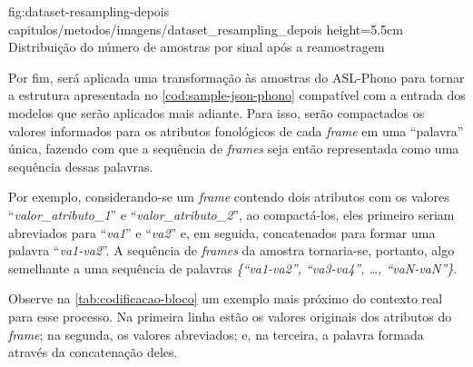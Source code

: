 \figura
{fig:dataset-resampling-depois} %
{capitulos/metodos/imagens/dataset_resampling_depois} %
{height=5.5cm} %
{Distribuição do número de amostras por sinal após a reamostragem} %
{} %





Por fim, será aplicada uma transformação às amostras do ASL-Phono para tornar a estrutura apresentada no \autoref{cod:sample-json-phono} compatível com a entrada dos modelos que serão aplicados mais adiante.
Para isso, serão compactados os valores informados para os atributos fonológicos de cada \textit{frame} em uma ``palavra'' única, fazendo com que a sequência de \textit{frames} seja então representada como uma sequência dessas palavras.

Por exemplo, considerando-se um \textit{frame} contendo dois atributos com os valores ``\textit{valor\_atributo\_1}'' e ``\textit{valor\_atributo\_2}'', ao compactá-los, eles primeiro seriam abreviados para ``\textit{va1}'' e ``\textit{va2}'' e, em seguida, concatenados para formar uma palavra ``\textit{va1-va2}''.  A sequência de \textit{frames} da amostra tornaria-se, portanto, algo semelhante a uma sequência de palavras \textit{\{``va1-va2'', ``va3-va4'', \dots, ``vaN-vaN''\}}.

Observe na \autoref{tab:codificacao-bloco} um exemplo mais próximo do contexto real para esse processo. Na primeira linha estão os valores originais dos atributos do \textit{frame}; na segunda, os valores abreviados; e, na terceira, a palavra formada através da concatenação deles.


